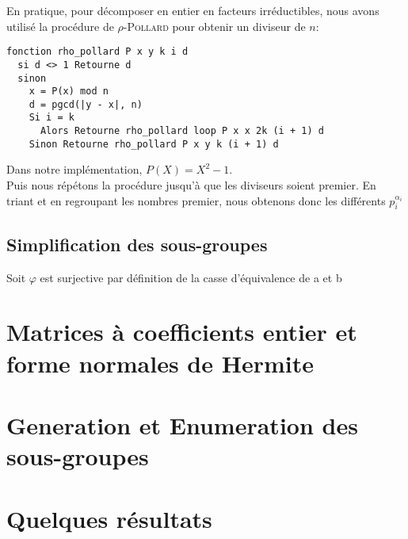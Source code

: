 \documentclass[11pt]{article}
\begin{document}
En pratique, pour décomposer en entier en facteurs irréductibles, nous avons utilisé la procédure de
\textsc{$\rho$-Pollard} pour obtenir un diviseur de $n$:
\begin{verbatim}
fonction rho_pollard P x y k i d
  si d <> 1 Retourne d
  sinon
    x = P(x) mod n
    d = pgcd(|y - x|, n)
    Si i = k
      Alors Retourne rho_pollard loop P x x 2k (i + 1) d
    Sinon Retourne rho_pollard P x y k (i + 1) d
\end{verbatim}
Dans notre implémentation, $P(X) = X^2 - 1$.\\
Puis nous répétons la procédure jusqu'à que les diviseurs soient premier.
En triant et en regroupant les nombres premier, nous obtenons donc les différents $p^{\alpha_i}_i$

\subsection{Simplification des sous-groupes}
Soit 
$\varphi$ est surjective par définition de la casse d'équivalence de a et b

\section{Matrices à coefficients entier et forme normales de Hermite}

%

\section {Generation et Enumeration des sous-groupes}

\section {Quelques résultats}
\end{document}
